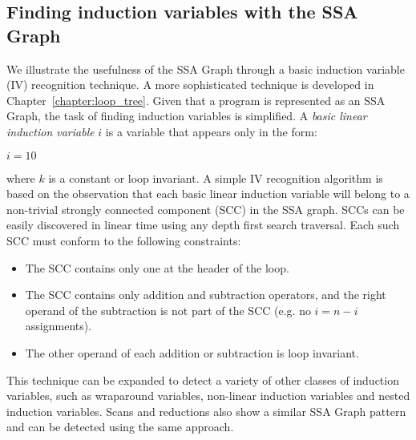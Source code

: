 \subsection{Finding induction variables with the SSA Graph}
We illustrate the usefulness of the SSA Graph through a basic induction variable (IV) recognition technique. 
A more sophisticated technique is developed in Chapter~\ref{chapter:loop_tree}. 
Given that a program is represented as an SSA Graph, the task of finding induction variables is simplified. 
A \textit{basic linear induction variable} $i$ is a variable that appears only in the form:

\begin{algorithm}[H]
  $i=10$\;
\end{algorithm}
where $k$ is a constant or loop invariant. 
A simple IV recognition algorithm is based on the observation that each basic linear induction variable will belong to a non-trivial strongly connected component (SCC) in the SSA graph. 
SCCs can be easily discovered in linear time using any depth first search traversal. 
Each such SCC must conform to the following constraints:

\begin{itemize}
\item The SCC contains only one \phifun at the header of the loop.
\item The SCC contains only addition and subtraction operators, and the right operand of the subtraction is not part of the SCC (e.g. no $i=n-i$ assignments).
\item The other operand of each addition or subtraction is loop invariant.
\end{itemize}

This technique can be expanded to detect a variety of other classes of induction variables, such as wraparound variables, non-linear induction variables and nested induction variables. 
Scans and reductions also show a similar SSA Graph pattern and can be detected using the same approach.

